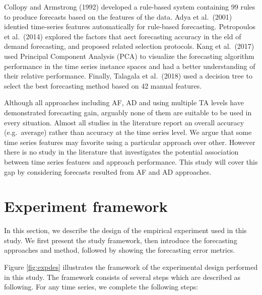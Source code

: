 \documentclass[preprint, 3p,
authoryear]{elsarticle} %
\begin{document}
Collopy and Armstrong (1992) developed a rule-based system containing 99
rules to produce forecasts based on the features of the data. Adya et
al.~(2001) identied time-series features automatically for rule-based
forecasting. Petropoulos et al.~(2014) explored the factors that aect
forecasting accuracy in the eld of demand forecasting, and proposed
related selection protocols. Kang et al.~(2017) used Principal Component
Analysis (PCA) to visualize the forecasting algorithm performance in the
time series instance spaces and had a better understanding of their
relative performance. Finally, Talagala et al.~(2018) used a decision
tree to select the best forecasting method based on 42 manual features.

Although all approaches including AF, AD and using multiple TA levels
have demonstrated forecasting gain, arguably none of them are suitable
to be used in every situation. Almost all studies in the literature
report an overall accuracy (e.g.~average) rather than accuracy at the
time series level. We argue that some time series features may favorite
using a particular approach over other. However there is no study in the
literature that investigates the potential association between time
series features and approach performance. This study will cover this gap
by considering forecasts resulted from AF and AD approaches.

\hypertarget{framework}{%
\section{Experiment framework}\label{framework}}

In this section, we describe the design of the empirical experiment used
in this study. We first present the study framework, then introduce the
forecasting approaches and method, followed by showing the forecasting
error metrics.

Figure \ref{fig:expdes} illustrates the framework of the experimental
design performed in this study. The framework consists of several steps
which are described as following. For any time series, we complete the
following steps:
\end{document}
